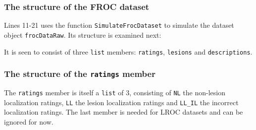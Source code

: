 \documentclass[
]{book}
\newenvironment{Shaded}{\begin{snugshade}}{\end{snugshade}}
\newcommand{\CommentTok}[1]{\textcolor[rgb]{0.56,0.35,0.01}{\textit{#1}}}
\newcommand{\FunctionTok}[1]{\textcolor[rgb]{0.00,0.00,0.00}{#1}}
\newcommand{\NormalTok}[1]{#1}
\begin{document}
\hypertarget{froc-empirical-examples-str-dataset}{%
\subsubsection{The structure of the FROC dataset}\label{froc-empirical-examples-str-dataset}}

Lines 11-21 uses the function \texttt{SimulateFrocDataset} to simulate the dataset object \texttt{frocDataRaw}. Its structure is examined next:

\begin{Shaded}
\end{Shaded}

It is seen to consist of three \texttt{list} members: \texttt{ratings}, \texttt{lesions} and \texttt{descriptions}.

\hypertarget{the-structure-of-the-ratings-member}{%
\subsubsection{\texorpdfstring{The structure of the \texttt{ratings} member}{The structure of the ratings member}}\label{the-structure-of-the-ratings-member}}

The \texttt{ratings} member is itself a \texttt{list} of 3, consisting of \texttt{NL} the non-lesion localization ratings, \texttt{LL} the lesion localization ratings and \texttt{LL\_IL} the incorrect localization ratings. The last member is needed for LROC datasets and can be ignored for now.
\end{document}
